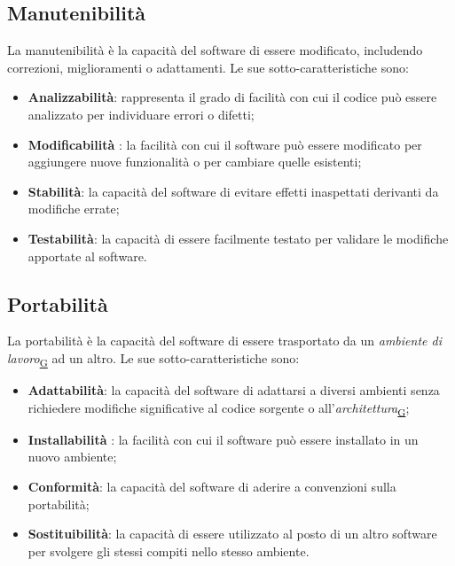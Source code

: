 \documentclass[a4paper,12pt]{article}
\begin{document}
\subsection{Manutenibilità}
La manutenibilità è la capacità del software di essere modificato, includendo correzioni, miglioramenti o adattamenti. Le sue sotto-caratteristiche sono:
\begin{itemize}
    \item \textbf{Analizzabilità}: rappresenta il grado di facilità con cui il codice può essere analizzato per individuare errori o difetti;
    \item \textbf{Modificabilità }: la facilità con cui il software può essere modificato per aggiungere nuove funzionalità o per cambiare quelle esistenti;
    \item \textbf{Stabilità}: la capacità del software di evitare effetti inaspettati derivanti da modifiche errate;
    \item \textbf{Testabilità}: la capacità di essere facilmente testato per validare le modifiche apportate al software.
\end{itemize}
\subsection{Portabilità}
La portabilità è la capacità del software di essere trasportato da un \textit{ambiente di lavoro}\textsubscript{\href{https://atlasteam9.github.io/Atlas/glossario.html\#Ambientedilavoro}{G}} ad un altro. Le sue sotto-caratteristiche sono:
\begin{itemize}
    \item \textbf{Adattabilità}: la capacità del software di adattarsi a diversi ambienti senza richiedere modifiche significative al codice sorgente o all'\textit{architettura}\textsubscript{\href{https://atlasteam9.github.io/Atlas/glossario.html\#Architettura}{G}};
    \item \textbf{Installabilità }: la facilità con cui il software può essere installato in un nuovo ambiente;
    \item \textbf{Conformità}: la capacità del software di aderire a convenzioni sulla portabilità;
    \item \textbf{Sostituibilità}: la capacità di essere utilizzato al posto di un altro software per svolgere gli stessi compiti nello stesso ambiente.
\end{itemize}

\newpage
\end{document}
